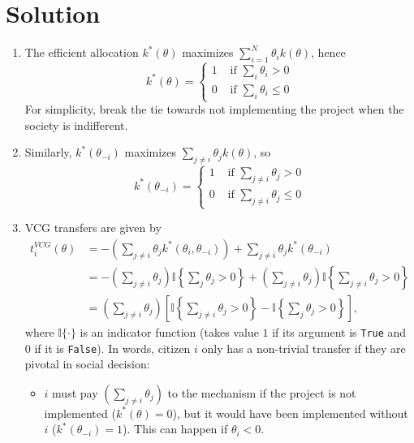 \documentclass[a4paper]{article}
\begin{document}
\section*{Solution}
	\begin{enumerate}
		\item The efficient allocation $k^*(\theta)$ maximizes $\sum_{i=1}^N \theta_i k(\theta)$, hence 
		$$
			k^*(\theta) = 
			\begin{cases}
				1 & \text{ if } \sum_i \theta_i > 0
				\\
				0 & \text{ if } \sum_i \theta_i \leq 0
			\end{cases}
		$$
		For simplicity, break the tie towards not implementing the project when the society is indifferent.
		
		\item Similarly, $k^*(\theta_{-i})$ maximizes $\sum_{j \neq i} \theta_j k(\theta)$, so 
		$$
		k^*(\theta_{-i}) = 
		\begin{cases}
		1 & \text{ if } \sum_{j \neq i} \theta_j > 0
		\\
		0 & \text{ if } \sum_{j \neq i} \theta_j \leq 0
		\end{cases}
		$$
		
		\item VCG transfers are given by
		\begin{align*}
			t_{i}^{VCG}(\theta) &= -\left(\sum_{j\neq i} \theta_j k^*(\theta_i, \theta_{-i}) \right) + \sum_{j\neq i} \theta_j k^*(\theta_{-i})
			\\
			&= -\left(\sum_{j\neq i} \theta_j \right) \mathbb{I}\left\{ \sum_j \theta_j > 0 \right\} +\left( \sum_{j\neq i} \theta_j \right) \mathbb{I}\left\{ \sum_{j \neq i} \theta_j > 0 \right\}
			\\
			&= \left(\sum_{j\neq i} \theta_j \right) \left[ \mathbb{I}\left\{ \sum_{j \neq i} \theta_j > 0 \right\} - \mathbb{I}\left\{ \sum_j \theta_j > 0 \right\} \right],
		\end{align*}
		where $\mathbb{I}\{\cdot\}$ is an indicator function (takes value $1$ if its argument is \texttt{True} and $0$ if it is \texttt{False}). In words, citizen $i$ only has a non-trivial transfer if they are pivotal in social decision:
		\begin{itemize}
			\item $i$ must pay $\left(\sum_{j\neq i} \theta_j \right)$ to the mechanism if the project is not implemented ($k^*(\theta)=0$), but it would have been implemented without $i$ ($k^*(\theta_{-i})=1$). This can happen if $\theta_i < 0$.
			

\end{itemize}
\end{enumerate}
\end{document}
